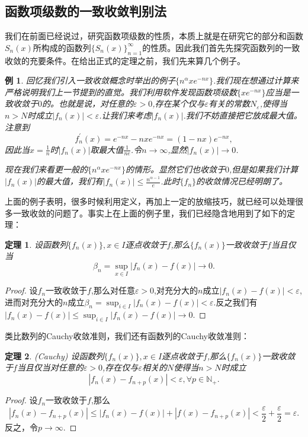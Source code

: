 \documentclass{article}
\newtheorem{theorem}{定理}[subsection]
\newtheorem{example}{例}[subsection]
\begin{document}
\subsection{函数项级数的一致收敛判别法}
我们在前面已经说过，研究函数项级数的性质，本质上就是在研究它的部分和函数$S_n(x)$所构成的函数列$\{S_n(x)\}_{n=1}^\infty$的性质。因此我们首先先探究函数列的一致收敛的充要条件。在给出正式的定理之前，我们先来算几个例子。
\begin{example}
回忆我们引入一致收敛概念时举出的例子$\{n^\alpha xe^{-nx}\}$.我们现在想通过计算来严格说明我们上一节提到的直觉。我们利用软件发现函数项级数$\{xe^{-nx}\}$应当是一致收敛于$0$的。也就是说，对任意的$\varepsilon>0$,存在某个仅与$\varepsilon$有关的常数$N_\varepsilon$,使得当$n>N$时成立$|f_n(x)|<\varepsilon$.让我们来考虑$|f_n(x)|$.我们不妨直接把它放成最大值。注意到
$$
f_{n}^{\prime}\left( x \right) =e^{-nx}-nxe^{-nx}=\left( 1-nx \right) e^{-nx},
$$
因此当$x=\frac{1}{n}$时$|f_n(x)|$取最大值$\frac{1}{ne}$.令$n\to\infty$,显然$|f_n(x)|\to 0$.\par
现在我们来看更一般的$\{n^\alpha xe^{-nx}\}$的情形。显然它们也收敛于$0$,但是如果我们计算$|f_n(x)|$的最大值，我们有$|f_n(x)|\le\frac{n^{\alpha-1}}{e}$.此时$\{f_n\}$的收敛情况已经明朗了。
\end{example}
上面的例子表明，很多时候利用定义，再加上一定的放缩技巧，就已经可以处理很多一致收敛的问题了。事实上在上面的例子里，我们已经隐含地用到了如下的定理：
\begin{theorem}
设函数列$\{f_n(x)\},x\in I$逐点收敛于$f$,那么$\{f_n(x)\}$一致收敛于$f$当且仅当
$$\beta_n=\sup_{x\in I}|f_n(x)-f(x)|\to 0.$$
\end{theorem}
\begin{proof}
设$f_n$一致收敛于$f$,那么对任意$\varepsilon>0$,对充分大的$n$成立$|f_n(x)-f(x)|<\varepsilon$,进而对充分大的$n$成立$\beta_n=\sup_{i\in I}|f_n(x)-f(x)|<\varepsilon$.反之我们有$|f_n(x)-f(x)|\le\sup_{i\in I}|f_n(x)-f(x)|\to 0$.
\end{proof}
类比数列的Cauchy收敛准则，我们还有函数列的Cauchy收敛准则：
\begin{theorem}(Cauchy)
设函数列$\{f_n(x)\},x\in I$逐点收敛于$f$,那么$\{f_n(x)\}$一致收敛于$f$当且仅当对任意的$\varepsilon>0$,存在仅与$\varepsilon$相关的$N$使得当$n>N$时成立
$$|f_n(x)-f_{n+p}(x)|<\varepsilon,\forall p\in\mathbb{N}_+.$$
\end{theorem}
\begin{proof}
设$f_n$一致收敛于$f$,那么
$$|f_n(x)-f_{n+p}(x)|\le|f_n(x)-f(x)|+|f(x)-f_{n+p}(x)|<\frac{\varepsilon}{2}+\frac{\varepsilon}{2}=\varepsilon.$$
反之，令$p\to\infty$.
\end{proof}
\end{document}

